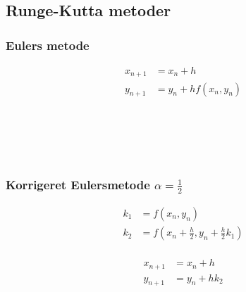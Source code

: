 %
\subsection{Runge-Kutta metoder}
\begin{frame}
\frametitle{Eulers metode } 
\begin{minipage}[b]{0.31\textwidth}
\begin{align*}
x_{n+1} & = x_n+h \\
y_{n+1} & = y_n + h f(x_n,y_n) \\
\phantom{x_1}\\
\\
\\
\end{align*}
\end{minipage}
\phantom{hejmeddig}
%

\\
\phantom{H}
\\
%
\end{frame}
%
%
%
%
\begin{frame}
\frametitle{Korrigeret Eulersmetode $\alpha = \frac{1}{2}$ } 
\begin{minipage}[t]{0.31\textwidth}
\begin{align*}
k_1 & = f(x_n , y_n) \\
k_2 & = f \left( x_n + \frac{h}{2} , y_n + \frac{h}{2} k_1 \right)  \\
\end{align*}
\end{minipage} 
\phantom{Hej}
\begin{minipage}[t]{0.31\textwidth}
\begin{align*}
x_{n+1} & = x_n+h \\
y_{n+1} & = y_n + h k_2 \\
\end{align*}
\end{minipage} 
\\
%

\\
\phantom{H}
\\
%
\end{frame}
%
%
%
